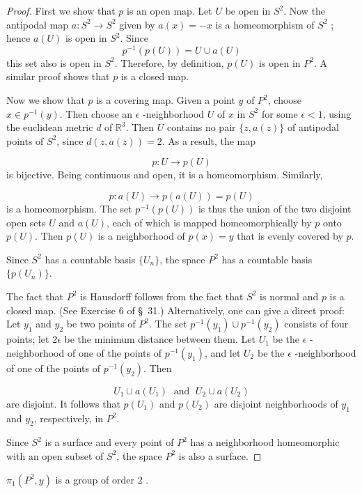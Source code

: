 \begin{proof}
First we show that \(p\) is an open map. Let \(U\) be open in \(S^{2}\). Now the antipodal map \(a : S^{2} \rightarrow {S}^{2}\) given by \(a(x) = - x\) is a homeomorphism of \(S^{2}\) ; hence \(a( U)\) is open in \(S^{2}\). Since
\[
p^{-1}( {p( U) }) = U \cup a( U)
\]
this set also is open in \(S^{2}\). Therefore, by definition, \(p( U)\) is open in \(P^{2}\). A similar proof shows that \(p\) is a closed map.

Now we show that \(p\) is a covering map. Given a point \(y\) of \(P^{2}\), choose \(x \in {p}^{-1}( y)\). Then choose an \(\epsilon\) -neighborhood \(U\) of \(x\) in \(S^{2}\) for some \(\epsilon < 1\), using the euclidean metric \(d\) of \(\mathbb{R}^{3}\). Then \(U\) contains no pair \(\{ z,a( z) \}\) of antipodal points of \(S^{2}\), since \(d( {z,a( z) }) = 2\). As a result, the map

\[
p : U \rightarrow p( U)
\]
is bijective. Being continuous and open, it is a homeomorphism. Similarly,

\[
p : a( U) \rightarrow p( {a( U) }) = p( U)
\]
is a homeomorphism. The set \(p^{-1}( {p( U) })\) is thus the union of the two disjoint open sets \(U\) and \(a( U)\), each of which is mapped homeomorphically by \(p\) onto \(p( U)\). Then \(p( U)\) is a neighborhood of \(p(x) = y\) that is evenly covered by \(p\).

Since \(S^{2}\) has a countable basis \(\{ U_{n}\}\), the space \(P^{2}\) has a countable basis \(\{ {p( U_{n}) }\}\).

The fact that \(P^{2}\) is Hausdorff follows from the fact that \(S^{2}\) is normal and \(p\) is a closed map. (See Exercise 6 of \S\ 31.) Alternatively, one can give a direct proof: Let \(y_{1}\) and \(y_{2}\) be two points of \(P^{2}\). The set \(p^{-1}( y_{1}) \cup {p}^{-1}( y_{2})\) consists of four points; let \({2\epsilon }\) be the minimum distance between them. Let \(U_{1}\) be the \(\epsilon\) -neighborhood of one of the points of \(p^{-1}( y_{1})\), and let \(U_{2}\) be the \(\epsilon\) -neighborhood of one of the points of \(p^{-1}( y_{2})\). Then

\[
U_{1} \cup a( U_{1}) \;\text{ and }\;U_{2} \cup a( U_{2})
\]
are disjoint. It follows that \(p( U_{1})\) and \(p( U_{2})\) are disjoint neighborhoods of \(y_{1}\) and \(y_{2}\), respectively, in \(P^{2}\).

Since \(S^{2}\) is a surface and every point of \(P^{2}\) has a neighborhood homeomorphic with an open subset of \(S^{2}\), the space \(P^{2}\) is also a surface.
\end{proof}
\begin{corollary}
\label{cor:\thetheorem}
\({\pi }_{1}( {P^{2},y})\) is a group of order 2 .
\end{corollary}

